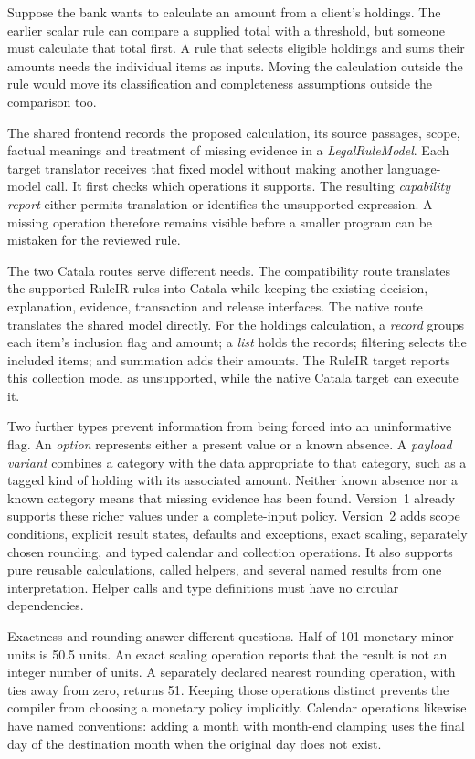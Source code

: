 Suppose the bank wants to calculate an amount from a client's holdings. The
earlier scalar rule can compare a supplied total with a threshold, but someone
must calculate that total first. A rule that selects eligible holdings and sums
their amounts needs the individual items as inputs. Moving the calculation
outside the rule would move its classification and completeness assumptions
outside the comparison too.

The shared frontend records the proposed calculation, its source passages,
scope, factual meanings and treatment of missing evidence in a
\emph{LegalRuleModel}. Each target translator receives that fixed model without
making another language-model call. It first checks which operations it
supports. The resulting \emph{capability report} either permits translation or
identifies the unsupported expression. A missing operation therefore remains
visible before a smaller program can be mistaken for the reviewed rule.

The two Catala routes serve different needs. The compatibility route translates
the supported RuleIR rules into Catala while keeping the existing decision,
explanation, evidence, transaction and release interfaces. The native route
translates the shared model directly. For the holdings calculation, a
\emph{record} groups each item's inclusion flag and amount; a \emph{list} holds
the records; filtering selects the included items; and summation adds their
amounts. The RuleIR target reports this collection model as unsupported, while
the native Catala target can execute it.

Two further types prevent information from being forced into an uninformative
flag. An \emph{option} represents either a present value or a known absence.
A \emph{payload variant} combines a category with the data appropriate to that
category, such as a tagged kind of holding with its associated amount. Neither
known absence nor a known category means that missing evidence has been found.
Version~1 already supports these richer values under a complete-input policy.
Version~2 adds scope conditions, explicit result states, defaults and exceptions,
exact scaling, separately chosen rounding, and typed calendar and collection
operations. It also supports pure reusable calculations, called helpers, and
several named results from one interpretation. Helper calls and type definitions
must have no circular dependencies.

Exactness and rounding answer different questions. Half of 101 monetary minor
units is 50.5 units. An exact scaling operation reports that the result is not
an integer number of units. A separately declared nearest rounding operation,
with ties away from zero, returns 51. Keeping those operations distinct prevents
the compiler from choosing a monetary policy implicitly. Calendar operations
likewise have named conventions: adding a month with month-end clamping uses
the final day of the destination month when the original day does not exist.


